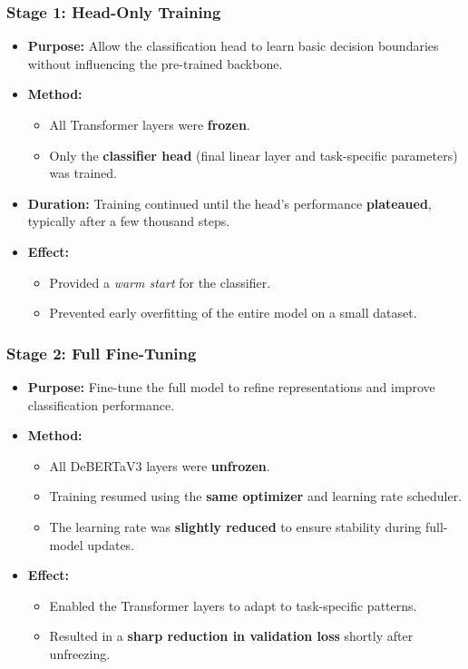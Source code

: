 \subsubsection*{Stage 1: Head-Only Training}
\begin{itemize}[leftmargin=1.5em]
    \item \textbf{Purpose:} Allow the classification head to learn basic decision boundaries without influencing the pre-trained backbone.
    \item \textbf{Method:}
    \begin{itemize}
        \item All Transformer layers were \textbf{frozen}.
        \item Only the \textbf{classifier head} (final linear layer and task-specific parameters) was trained.
    \end{itemize}
    \item \textbf{Duration:} Training continued until the head's performance \textbf{plateaued}, typically after a few thousand steps.
    \item \textbf{Effect:}
    \begin{itemize}
        \item Provided a \textit{warm start} for the classifier.
        \item Prevented early overfitting of the entire model on a small dataset.
    \end{itemize}
\end{itemize}

\subsubsection*{Stage 2: Full Fine-Tuning}
\begin{itemize}[leftmargin=1.5em]
    \item \textbf{Purpose:} Fine-tune the full model to refine representations and improve classification performance.
    \item \textbf{Method:}
    \begin{itemize}
        \item All \ac{DeBERTaV3} layers were \textbf{unfrozen}.
        \item Training resumed using the \textbf{same optimizer} and learning rate scheduler.
        \item The learning rate was \textbf{slightly reduced} to ensure stability during full-model updates.
    \end{itemize}
    \item \textbf{Effect:}
    \begin{itemize}
        \item Enabled the Transformer layers to adapt to task-specific patterns.
        \item Resulted in a \textbf{sharp reduction in validation loss} shortly after unfreezing.
    \end{itemize}
\end{itemize}

